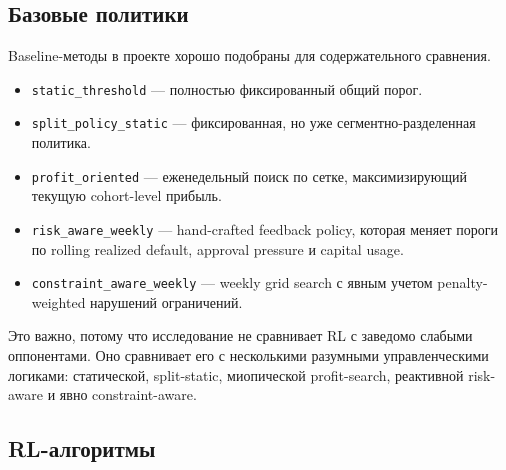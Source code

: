 \documentclass[12pt,a4paper]{article}
\begin{document}
\subsection{Базовые политики}

Baseline-методы в проекте хорошо подобраны для содержательного сравнения.
\begin{itemize}[leftmargin=*]
    \item \texttt{static\_threshold} --- полностью фиксированный общий порог.
    \item \texttt{split\_policy\_static} --- фиксированная, но уже сегментно-разделенная политика.
    \item \texttt{profit\_oriented} --- еженедельный поиск по сетке, максимизирующий текущую cohort-level прибыль.
    \item \texttt{risk\_aware\_weekly} --- hand-crafted feedback policy, которая меняет пороги по rolling realized default, approval pressure и capital usage.
    \item \texttt{constraint\_aware\_weekly} --- weekly grid search с явным учетом penalty-weighted нарушений ограничений.
\end{itemize}

Это важно, потому что исследование не сравнивает RL с заведомо слабыми оппонентами. Оно сравнивает его с несколькими разумными управленческими логиками: статической, split-static, миопической profit-search, реактивной risk-aware и явно constraint-aware.

\subsection{RL-алгоритмы}
\end{document}

